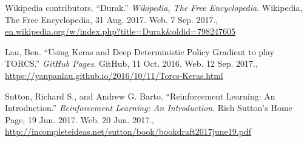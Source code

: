 \documentclass[a4paper,titlepage]{article}
\begin{document}
\newpage

\begin{thebibliography}{9}

  Wikipedia contributors. ``Durak.'' \emph{Wikipedia, The Free Encyclopedia}. Wikipedia, The Free Encyclopedia, 31 Aug. 2017. Web.
  7 Sep. 2017., \\
  \url{en.wikipedia.org/w/index.php?title=Durak&oldid=798247605}

  Lau, Ben. ``Using Keras and Deep Deterministic Policy Gradient to play TORCS.'' \emph{GitHub Pages}. GitHub, 11 Oct. 2016. Web.
  12 Sep. 2017., \\
  \url{https://yanpanlau.github.io/2016/10/11/Torcs-Keras.html}

  Sutton, Richard S., and Andrew G. Barto. ``Reinforcement Learning: An Introduction.'' \emph{Reinforcement Learning: An Introduction}. Rich Sutton's Home Page, 19 Jun. 2017. Web.
  20 Jun. 2017., \\
  \url{http://incompleteideas.net/sutton/book/bookdraft2017june19.pdf}

\end{thebibliography}
\end{document}
